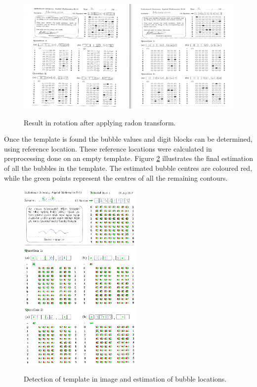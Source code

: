 \begin{figure}
  \centering
  \includegraphics[width=14cm]{Rotation}\\
  \caption{Result in rotation after applying radon transform.}
  \label{fig:rotate}
\end{figure}

Once the template is found the bubble values and digit blocks can be determined, using reference location. These reference locations were calculated in preprocessing done on an empty template. Figure \ref{fig:FinalEstimate} illustrates the final estimation of all the bubbles in the template. The estimated bubble centres are coloured red, while the green points represent the centres of all the remaining contours.

\begin{figure}
  \centering
  \includegraphics[width=6cm]{FinalEstimate}\\
  \caption{Detection of template in image and estimation of bubble locations.}
  \label{fig:FinalEstimate}
\end{figure}

